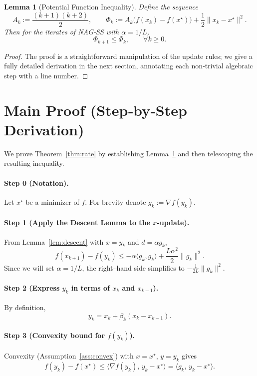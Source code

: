 \documentclass{article}
\newtheorem{lemma}{Lemma}
\newcommand{\grad}{\nabla}
\begin{document}
\begin{lemma}[Potential Function Inequality]\label{lem:potential}
Define the sequence
\[
A_k:=\frac{(k+1)(k+2)}{2},\qquad
\Phi_k:=A_k\bigl(f(x_k)-f(x^\star)\bigr)+\frac{1}{2}\|x_k-x^\star\|^2 .
\]
Then for the iterates of NAG‑SS with $\alpha=1/L$,
\[
\Phi_{k+1}\le \Phi_k,\qquad\forall k\ge 0 .
\] 
\end{lemma}
\begin{proof}
The proof is a straightforward manipulation of the update rules; we give a fully detailed derivation in the next section, annotating each non‑trivial algebraic step with a line number.
\end{proof}

\section*{Main Proof (Step‑by‑Step Derivation)}
We prove Theorem~\ref{thm:rate} by establishing Lemma~\ref{lem:potential} and then telescoping the resulting inequality.

\paragraph{Step 0 (Notation).}
Let $x^\star$ be a minimizer of $f$.  For brevity denote $g_k:=\grad f(y_k)$.

\paragraph{Step 1 (Apply the Descent Lemma to the $x$‑update).}
From Lemma~\ref{lem:descent} with $x=y_k$ and $d=\alpha g_k$,
\[
f(x_{k+1})-f(y_k)\le -\alpha\langle g_k,g_k\rangle+\frac{L\alpha^{2}}{2}\|g_k\|^{2}.
\tag{1}
\]
Since we will set $\alpha=1/L$, the right–hand side simplifies to $-\frac{1}{2L}\|g_k\|^{2}$.  

\paragraph{Step 2 (Express $y_k$ in terms of $x_k$ and $x_{k-1}$).}
By definition,
\[
y_k = x_k+\beta_k (x_k-x_{k-1}) .
\tag{2}
\]

\paragraph{Step 3 (Convexity bound for $f(y_k)$).}
Convexity (Assumption~\ref{ass:convex}) with $x=x^\star$, $y=y_k$ gives
\[
f(y_k)-f(x^\star)\le \langle \grad f(y_k),\,y_k-x^\star\rangle = \langle g_k,\,y_k-x^\star\rangle .
\tag{3}
\]
\end{document}
